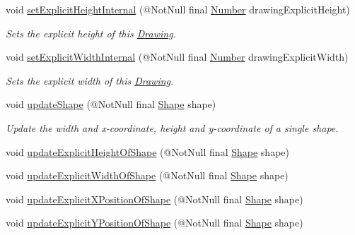 \begin{DoxyCompactItemize}
void \hyperlink{classcom_1_1aarrelaakso_1_1drawl_1_1_drawing_a54f9447ef03b883cac2bf4535e777a7a}{set\+Explicit\+Height\+Internal} (@Not\+Null final \hyperlink{interfacecom_1_1aarrelaakso_1_1drawl_1_1_number}{Number} drawing\+Explicit\+Height)
\begin{DoxyCompactList}\small\item\em Sets the explicit height of this \hyperlink{classcom_1_1aarrelaakso_1_1drawl_1_1_drawing}{Drawing}. \end{DoxyCompactList}\item 
void \hyperlink{classcom_1_1aarrelaakso_1_1drawl_1_1_drawing_a7083d7046d42a99050495007854b5908}{set\+Explicit\+Width\+Internal} (@Not\+Null final \hyperlink{interfacecom_1_1aarrelaakso_1_1drawl_1_1_number}{Number} drawing\+Explicit\+Width)
\begin{DoxyCompactList}\small\item\em Sets the explicit width of this \hyperlink{classcom_1_1aarrelaakso_1_1drawl_1_1_drawing}{Drawing}. \end{DoxyCompactList}\item 
void \hyperlink{classcom_1_1aarrelaakso_1_1drawl_1_1_drawing_aa60d355859fa4dc21d2670aced9ee927}{update\+Shape} (@Not\+Null final \hyperlink{classcom_1_1aarrelaakso_1_1drawl_1_1_shape}{Shape} shape)
\begin{DoxyCompactList}\small\item\em Update the width and x-\/coordinate, height and y-\/coordinate of a single shape. \end{DoxyCompactList}\item 
void \hyperlink{classcom_1_1aarrelaakso_1_1drawl_1_1_drawing_ab55b53c2e069f28185865f5cf677c8cd}{update\+Explicit\+Height\+Of\+Shape} (@Not\+Null final \hyperlink{classcom_1_1aarrelaakso_1_1drawl_1_1_shape}{Shape} shape)
\item 
void \hyperlink{classcom_1_1aarrelaakso_1_1drawl_1_1_drawing_a5c146de66e8f3272b57322f1cee7d7d6}{update\+Explicit\+Width\+Of\+Shape} (@Not\+Null final \hyperlink{classcom_1_1aarrelaakso_1_1drawl_1_1_shape}{Shape} shape)
\item 
void \hyperlink{classcom_1_1aarrelaakso_1_1drawl_1_1_drawing_a9ae55cefe8729385c2a9cb8b9aff6763}{update\+Explicit\+X\+Position\+Of\+Shape} (@Not\+Null final \hyperlink{classcom_1_1aarrelaakso_1_1drawl_1_1_shape}{Shape} shape)
\item 
void \hyperlink{classcom_1_1aarrelaakso_1_1drawl_1_1_drawing_a52d5971daf6f95d27bcdf7650d0a9e37}{update\+Explicit\+Y\+Position\+Of\+Shape} (@Not\+Null final \hyperlink{classcom_1_1aarrelaakso_1_1drawl_1_1_shape}{Shape} shape)
\end{DoxyCompactItemize}
